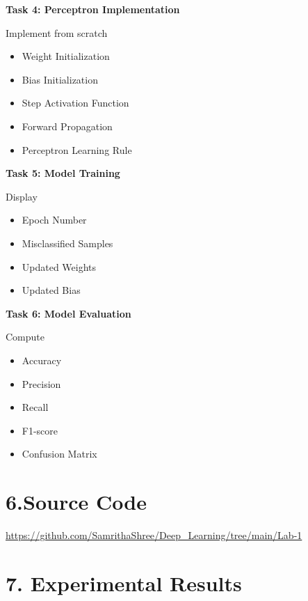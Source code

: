 \documentclass[11pt]{article}
\begin{document}
\vspace{2mm}

\textbf{Task 4: Perceptron Implementation}

Implement from scratch

\begin{itemize}
\item Weight Initialization
\item Bias Initialization
\item Step Activation Function
\item Forward Propagation
\item Perceptron Learning Rule
\end{itemize}

\vspace{2mm}

\textbf{Task 5: Model Training}

Display

\begin{itemize}
\item Epoch Number
\item Misclassified Samples
\item Updated Weights
\item Updated Bias
\end{itemize}

\vspace{2mm}

\textbf{Task 6: Model Evaluation}

Compute

\begin{itemize}
\item Accuracy
\item Precision
\item Recall
\item F1-score
\item Confusion Matrix
\end{itemize}


\section*{6.Source Code}

\url{https://github.com/SamrithaShree/Deep_Learning/tree/main/Lab-1}

\section*{7. Experimental Results}
\end{document}
